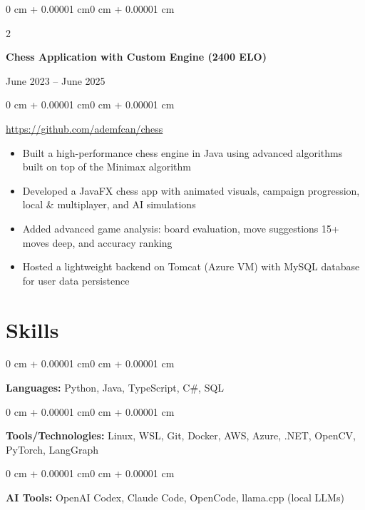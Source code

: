 \documentclass[11pt, letterpaper]{article}
\newenvironment{highlights}{
    \begin{itemize}[
        topsep=0.06 cm,
        parsep=0.06 cm,
        partopsep=0pt,
        itemsep=0pt,
        leftmargin=0 cm + 10pt
    ]
}{\end{itemize}}
\newenvironment{onecolentry}{
    \begin{adjustwidth}{0 cm + 0.00001 cm}{0 cm + 0.00001 cm}
}{\end{adjustwidth}}
\newenvironment{bodyonecolentry}{
    \begin{onecolentry}\small
}{\end{onecolentry}}
\newenvironment{twocolentry}[2][]{
    \onecolentry
    \def\secondColumn{#2}
    \setcolumnwidth{\fill, 4.5 cm}
    \begin{paracol}{2}
}{
    \switchcolumn \raggedleft \secondColumn
    \end{paracol}
    \endonecolentry
}
\let\hrefWithoutArrow\href
\begin{document}
    \begin{twocolentry}{June 2023 -- June 2025}
        \textbf{Chess Application with Custom Engine (2400 ELO)}
    \end{twocolentry}
    \vspace{0.08 cm}
    \begin{bodyonecolentry}
        \hrefWithoutArrow{https://github.com/Ademfcan/chess}{https://github.com/ademfcan/chess}
        \begin{highlights}
            \item Built a high-performance chess engine in Java using advanced algorithms built on top of the Minimax algorithm
            \item Developed a JavaFX chess app with animated visuals, campaign progression, local \& multiplayer, and AI simulations
            \item Added advanced game analysis: board evaluation, move suggestions 15+ moves deep, and accuracy ranking
            \item Hosted a lightweight backend on Tomcat (Azure VM) with MySQL database for user data persistence
        \end{highlights}
    \end{bodyonecolentry}

    \section{Skills}

    \begin{bodyonecolentry}
        \textbf{Languages:} Python, Java, TypeScript, C\#, SQL
    \end{bodyonecolentry}

    \vspace{0.12 cm}

    \begin{bodyonecolentry}
        \textbf{Tools/Technologies:} Linux, WSL, Git, Docker, AWS, Azure, .NET, OpenCV, PyTorch, LangGraph
    \end{bodyonecolentry}

    \vspace{0.12 cm}

    \begin{bodyonecolentry}
        \textbf{AI Tools:} OpenAI Codex, Claude Code, OpenCode, llama.cpp (local LLMs)
    \end{bodyonecolentry}
\end{document}

